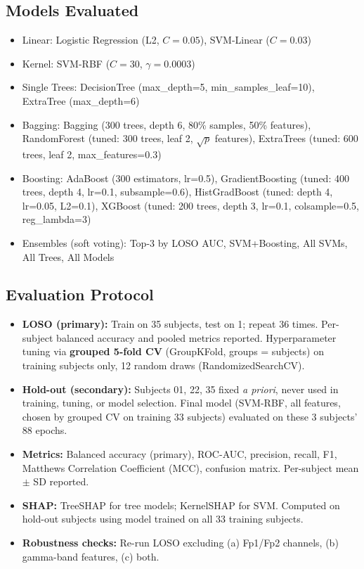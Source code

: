 \documentclass[conference]{IEEEtran}
\begin{document}
\subsection{Models Evaluated}
\label{sec:models}
\begin{itemize}
    \item Linear: Logistic Regression (L2, $C=0.05$), SVM-Linear ($C=0.03$)
    \item Kernel: SVM-RBF ($C=30$, $\gamma=0.0003$)
    \item Single Trees: DecisionTree (max\_depth=5, min\_samples\_leaf=10), ExtraTree (max\_depth=6)
    \item Bagging: Bagging (300 trees, depth 6, 80\% samples, 50\% features), RandomForest (tuned: 300 trees, leaf 2, $\sqrt{p}$ features), ExtraTrees (tuned: 600 trees, leaf 2, max\_features=0.3)
    \item Boosting: AdaBoost (300 estimators, lr=0.5), GradientBoosting (tuned: 400 trees, depth 4, lr=0.1, subsample=0.6), HistGradBoost (tuned: depth 4, lr=0.05, L2=0.1), XGBoost (tuned: 200 trees, depth 3, lr=0.1, colsample=0.5, reg\_lambda=3)
    \item Ensembles (soft voting): Top-3 by LOSO AUC, SVM+Boosting, All SVMs, All Trees, All Models
\end{itemize}

\subsection{Evaluation Protocol}
\label{sec:eval}
\begin{itemize}
    \item \textbf{LOSO (primary):} Train on 35 subjects, test on 1; repeat 36 times. Per-subject balanced accuracy and pooled metrics reported. Hyperparameter tuning via \textbf{grouped 5-fold CV} (GroupKFold, groups = subjects) on training subjects only, \num{12} random draws (RandomizedSearchCV).
    \item \textbf{Hold-out (secondary):} Subjects 01, 22, 35 fixed \textit{a priori}, never used in training, tuning, or model selection. Final model (SVM-RBF, all features, chosen by grouped CV on training 33 subjects) evaluated on these 3 subjects' \num{88} epochs.
    \item \textbf{Metrics:} Balanced accuracy (primary), ROC-AUC, precision, recall, F1, Matthews Correlation Coefficient (MCC), confusion matrix. Per-subject mean $\pm$ SD reported.
    \item \textbf{SHAP:} TreeSHAP for tree models; KernelSHAP for SVM. Computed on hold-out subjects using model trained on all 33 training subjects.
    \item \textbf{Robustness checks:} Re-run LOSO excluding (a) Fp1/Fp2 channels, (b) gamma-band features, (c) both.
\end{itemize}
\end{document}
